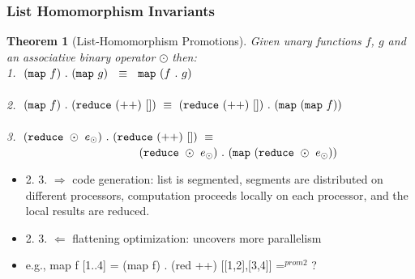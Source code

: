 \documentclass{beamer}
\newcommand{\red}[1]{\textcolor{Red}{{#1}}}
\renewcommand{\emph}[1]{\textcolor{structure}{#1}}
\newcommand{\emp}[1]{\textcolor{DikuRed}{ #1}}
\newtheorem{mytheo}{Theorem}
\begin{document}
\begin{frame}[fragile,t]
  \frametitle{List Homomorphism Invariants}

\begin{mytheo}[List-Homomorphism Promotions]\label{LHomInv}
Given unary functions $f$, $g$ and an associative binary operator $\odot$ then:\\
\emp{1.}$\ \ ({\tt map} \ f) \ . \ ({\tt map} \ g) \ \ \equiv \ \ {\tt map} \ (f \ . \ g)$\\
$\mbox{ }$ \\
\emp{2.}$\ \ ({\tt map} \ f) \ . \ ({\tt reduce} \ ({\tt ++}) \ []) \ \equiv \ ({\tt reduce} \ ({\tt ++}) \ []) \ . \ ({\tt map} \ ({\tt map} \ f) )$ \\
$\mbox{ }$ \\
\emp{3.}$\ \ ({\tt reduce} \ \odot \ e_{\odot}) \ . \ ({\tt reduce} \ (++) \ []) \ \equiv$\\
$ \ \ \ \ \ \ \ \ \ \ \ \ \ \ \ \ \ \ \ \ \ \ \ \ \ \ \ \ \ \ \ \ \ \ \
({\tt reduce} \ \odot \ e_{\odot}) \ . \ ({\tt map} \ ({\tt reduce} \ \odot \ e_{\odot}) )$
\end{mytheo}

%  

\begin{itemize}
    \item \emp{2. 3. $\Rightarrow$ code generation:} list is segmented, 
            segments are distributed on different processors, 
            computation proceeds locally on each processor, 
            and the local results are reduced. 
    \item \emph{2. 3. $\Leftarrow$ flattening optimization}: 
            uncovers more parallelism
    \item e.g., map f [1..4] = (map f) . (red ++) [[1,2],[3,4]] =$^{prom2}$ \alert{?}           
\end{itemize}

\end{frame}
\end{document}
